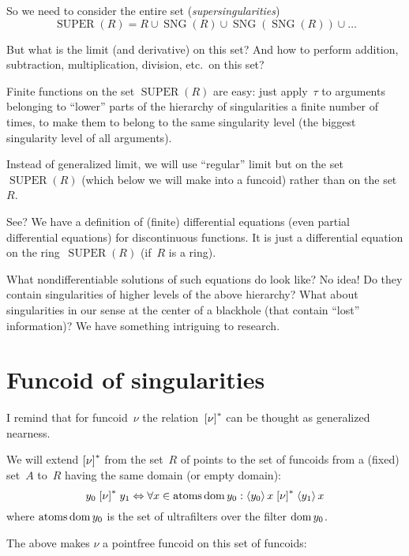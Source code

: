 So we need to consider the entire set (\emph{supersingularities})
\[
\operatorname{SUPER}(R) =
R\cup\operatorname{SNG}(R)\cup
\operatorname{SNG}(\operatorname{SNG}(R))\cup\dots
\]

But what is the limit (and derivative) on this set? And how to perform addition, subtraction, multiplication, division, etc.\ on this set?

Finite functions on the set $\operatorname{SUPER}(R)$ are easy: just apply~$\tau$ to arguments belonging to ``lower'' parts of the hierarchy of singularities a finite number of times, to make them to belong to the same singularity level (the biggest singularity level of all arguments).

Instead of generalized limit, we will use ``regular'' limit but on the set $\operatorname{SUPER}(R)$ (which below we will make into a funcoid) rather than on the set~$R$.

See? We have a definition of (finite) differential equations (even partial differential equations) for discontinuous functions. It is just a differential equation on the ring~$\operatorname{SUPER}(R)$ (if~$R$ is a ring).

What nondifferentiable solutions of such equations do look like? No idea! Do they contain singularities of higher levels of the above hierarchy? What about singularities in our sense at the center of a blackhole (that contain ``lost'' information)? We have something intriguing to research.

\chapter{Funcoid of singularities}

I remind that for funcoid~$\nu$ the relation~$\mathrel{\left[\nu\right]^{\ast}}$ can be thought as generalized nearness.

We will extend $\mathrel{\left[\nu\right]^{\ast}}$ from the set~$R$ of points to the set of funcoids from a (fixed) set~$A$ to~$R$ having the same domain (or empty domain):
\[
y_0 \mathrel{\left[\nu\right]^{\ast}} y_1 \Leftrightarrow
\forall x\in\operatorname{atoms}\operatorname{dom} y_0:
\left\langle y_0\right\rangle x \mathrel{\left[\nu\right]^{\ast}} \left\langle y_1\right\rangle x
\]
where $\operatorname{atoms}\operatorname{dom} y_0$ is the set of ultrafilters over the filter $\operatorname{dom} y_0$.

The above makes $\nu$ a pointfree funcoid on this set of funcoids:

